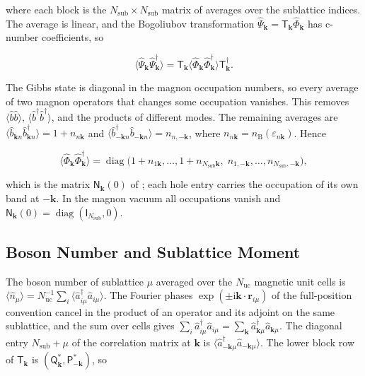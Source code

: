 where each block is the \(N_{\mathrm{sub}}\times N_{\mathrm{sub}}\) matrix of averages over the sublattice indices. The average is linear, and the Bogoliubov transformation \(\hat\Psi_{\mathbf k}=\mathsf T_{\mathbf k}\hat\Phi_{\mathbf k}\) has c-number coefficients, so

\[
\big\langle\hat\Psi_{\mathbf k}\hat\Psi_{\mathbf k}^\dagger\big\rangle
=\mathsf T_{\mathbf k}\big\langle\hat\Phi_{\mathbf k}\hat\Phi_{\mathbf k}^\dagger\big\rangle\mathsf T_{\mathbf k}^\dagger.
\]

The Gibbs state is diagonal in the magnon occupation numbers, so every average of two magnon operators that changes some occupation vanishes. This removes \(\langle\hat b\hat b\rangle\), \(\langle\hat b^\dagger\hat b^\dagger\rangle\), and the products of different modes. The remaining averages are \(\langle\hat b_{\mathbf kn}\hat b_{\mathbf kn}^\dagger\rangle=1+n_{n\mathbf k}\) and \(\langle\hat b_{-\mathbf kn}^\dagger\hat b_{-\mathbf kn}\rangle=n_{n,-\mathbf k}\), where \(n_{n\mathbf k}=n_{\mathrm B}(\varepsilon_{n\mathbf k})\). Hence

\[
\big\langle\hat\Phi_{\mathbf k}\hat\Phi_{\mathbf k}^\dagger\big\rangle
=\operatorname{diag}\big(1+n_{1\mathbf k},\ldots,1+n_{N_{\mathrm{sub}}\mathbf k},\;n_{1,-\mathbf k},\ldots,n_{N_{\mathrm{sub}},-\mathbf k}\big),
\]

which is the matrix \(\mathsf N_{\mathbf k}(0)\) of ; each hole entry carries the occupation of its own band at \(-\mathbf k\). In the magnon vacuum all occupations vanish and \(\mathsf N_{\mathbf k}(0)=\operatorname{diag}(\mathsf I_{N_{\mathrm{sub}}},0)\).

\subsection{Boson Number and Sublattice Moment}

The boson number of sublattice \(\mu\) averaged over the \(N_{\mathrm{uc}}\) magnetic unit cells is \(\langle\hat n_\mu\rangle=N_{\mathrm{uc}}^{-1}\sum_i\langle\hat a_{i\mu}^\dagger\hat a_{i\mu}\rangle\). The Fourier phases \(\exp(\pm\mathrm i\mathbf k\cdot\mathbf r_{i\mu})\) of the full-position convention cancel in the product of an operator and its adjoint on the same sublattice, and the sum over cells gives \(\sum_i\hat a_{i\mu}^\dagger\hat a_{i\mu}=\sum_{\mathbf k}\hat a_{\mathbf k\mu}^\dagger\hat a_{\mathbf k\mu}\). The diagonal entry \(N_{\mathrm{sub}}+\mu\) of the correlation matrix at \(\mathbf k\) is \(\langle\hat a_{-\mathbf k\mu}^\dagger\hat a_{-\mathbf k\mu}\rangle\). The lower block row of \(\mathsf T_{\mathbf k}\) is \((\mathsf Q_{\mathbf k}^*,\mathsf P_{-\mathbf k}^*)\), so

